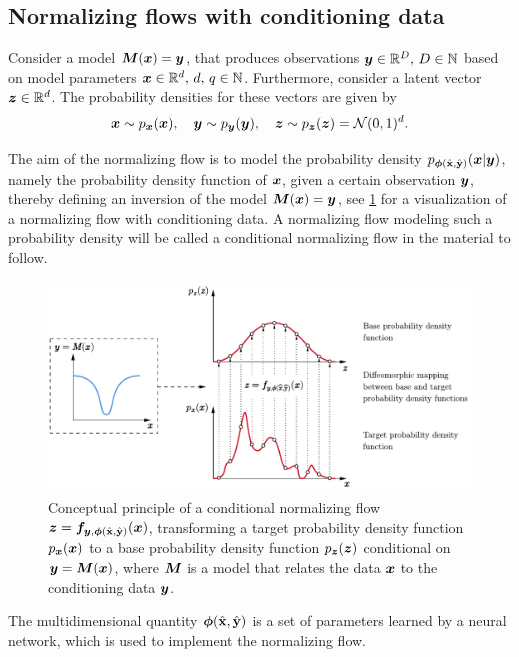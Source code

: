 \documentclass[a4paper,12pt]{report}
\begin{document}
\subsection{Normalizing flows with conditioning data}
Consider a model $\bm{M}(\bm{x}) = \bm{y}$, that produces observations $\bm{y} \in \mathbb{R}^D,\,D \in \mathbb{N}$ based on model parameters $\bm{x}\in\mathbb{R}^d,\,d,\,q \in \mathbb{N}$. Furthermore, consider a latent vector $\bm{z} \in \mathbb{R}^d$. The probability densities for these vectors are given by \begin{equation}
\bm{x} \sim p_{\bm{x}}(\bm{x}), \quad \bm{y} \sim p_{\bm{y}}(\bm{y}), \quad \bm{z}\sim p_{\bm{z}}(\bm{z}) = \mathcal{N}(0,1)^d.
\end{equation}

The aim of the normalizing flow is to model the probability density $p_{\bm{\phi}(\hat{\boldsymbol{\mathbf{x}}},\hat{\boldsymbol{\mathbf{y}}})}(\bm{x}|\bm{y})$, namely the probability density function of $\bm{x}$, given a certain observation $\bm{y}$, thereby defining an inversion of the model $\bm{M}(\bm{x}) = \bm{y}$, see \cref{fig:normflowconditional} for a visualization of a normalizing flow with conditioning data. A normalizing flow modeling such a probability density will be called a conditional normalizing flow in the material to follow.
\begin{figure}[h]
\centering
\includegraphics[width=\textwidth]{figures/normflowconditional.pdf}
\caption{Conceptual principle of a conditional normalizing flow $\bm{z} = \bm{f}_{\bm{y},\bm{\phi}(\hat{\boldsymbol{\mathbf{x}}},\hat{\boldsymbol{\mathbf{y}}})}(\bm{x})$, transforming a target probability density function $p_{\bm{x}}(\bm{x})$ to a base probability density function $p_{\bm{z}}(\bm{z})$ conditional on $\bm{y} = \bm{M}(\bm{x})$, where $\bm{M}$ is a model that relates the data $\bm{x}$ to the conditioning data $\bm{y}$.}
\label{fig:normflowconditional}
\end{figure}
The multidimensional quantity $\bm{\phi}(\hat{\boldsymbol{\mathbf{x}}},\hat{\boldsymbol{\mathbf{y}}})$ is a set of parameters learned by a neural network, which is used to implement the normalizing flow.
\end{document}
